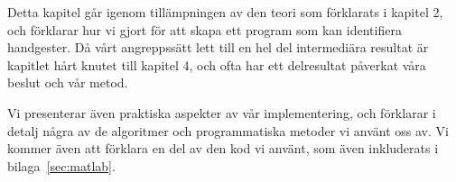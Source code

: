 \documentclass[../rapport_MVEX01-11-05]{subfiles}
\begin{document}
Detta kapitel går igenom tillämpningen av den teori som förklarats
i kapitel 2, och förklarar hur vi gjort för att skapa ett program som kan
identifiera handgester. Då vårt angreppssätt lett till en hel del intermediära
resultat är kapitlet hårt knutet till kapitel 4, och ofta
har ett delresultat påverkat våra beslut och vår metod.

Vi presenterar även praktiska aspekter av vår implementering, och förklarar
i detalj några av de algoritmer och programmatiska metoder vi använt oss av.
Vi kommer även att förklara en del av den kod vi använt, som även inkluderats i
bilaga~\ref{sec:matlab}.
\end{document}
